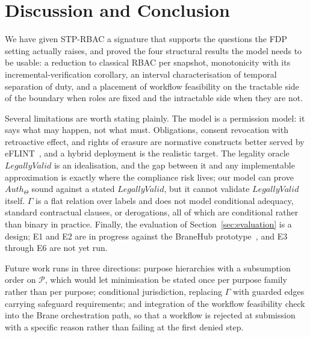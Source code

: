 \documentclass[11pt]{article}
\theoremstyle{definition}
\theoremstyle{plain}
\theoremstyle{remark}
\newcommand{\Auth}{\mathit{Auth}}
\newcommand{\LegalOK}{\mathit{LegallyValid}}
\newcommand{\Pdom}{\mathcal{P}}
\begin{document}
\section{Discussion and Conclusion}
\label{sec:conclusion}

We have given STP-RBAC a signature that supports the questions the FDP setting
actually raises, and proved the four structural results the model needs to be
usable: a reduction to classical RBAC per snapshot, monotonicity with its
incremental-verification corollary, an interval characterisation of temporal
separation of duty, and a placement of workflow feasibility on the tractable
side of the boundary when roles are fixed and the intractable side when they are
not.

Several limitations are worth stating plainly. The model is a permission model:
it says what may happen, not what must. Obligations, consent revocation with
retroactive effect, and rights of erasure are normative constructs better served
by eFLINT~\citep{binsbergen2020eflint}, and a hybrid deployment is the realistic
target. The legality oracle $\LegalOK$ is an idealisation, and the gap between
it and any implementable approximation is exactly where the compliance risk
lives; our model can prove $\Auth_\Theta$ sound against a stated $\LegalOK$, but
it cannot validate $\LegalOK$ itself. $\Gamma$ is a flat relation over labels
and does not model conditional adequacy, standard contractual clauses, or
derogations, all of which are conditional rather than binary in practice.
Finally, the evaluation of Section~\ref{sec:evaluation} is a design; E1 and E2
are in progress against the BraneHub prototype~\citep{kokash2026branehub}, and
E3 through E6 are not yet run.

Future work runs in three directions: purpose hierarchies with a subsumption
order on $\Pdom$, which would let minimisation be stated once per purpose family
rather than per purpose; conditional jurisdiction, replacing $\Gamma$ with
guarded edges carrying safeguard requirements; and integration of the workflow
feasibility check into the Brane orchestration path, so that a workflow is
rejected at submission with a specific reason rather than failing at the first
denied step.



\end{document}
